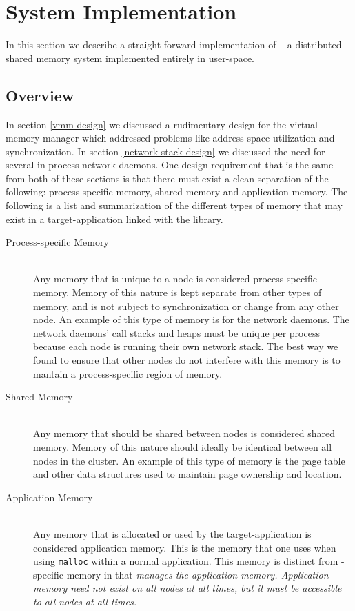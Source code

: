 \section{System Implementation}

In this section we describe a straight-forward implementation of \projname{} -- a distributed shared memory system implemented entirely in user-space.

\subsection{Overview}
In section \ref{vmm-design} we discussed a rudimentary design for the virtual memory manager which addressed problems like address space utilization and synchronization.  In section \ref{network-stack-design} we discussed the need for several in-process network daemons.  One design requirement that is the same from both of these sections is that there must exist a clean separation of the following: process-specific memory, shared memory and application memory.  The following is a list and summarization of the different types of memory that may exist in a target-application linked with the \projname{} library.

\begin{description}
\item[Process-specific Memory] \hfill \\
Any memory that is unique to a \projname{} node is considered process-specific memory.  Memory of this nature is kept separate from other types of memory, and is not subject to synchronization or change from any other node.  An example of this type of memory is for the network daemons.  The network daemons' call stacks and heaps must be unique per process because each node is running their own network stack.  The best way we found to ensure that other nodes do not interfere with this memory is to mantain a process-specific region of memory.

\item[Shared Memory] \hfill \\
Any memory that should be shared between \projname{} nodes is considered shared memory.  Memory of this nature should ideally be identical between all nodes in the cluster.  An example of this type of memory is the page table and other data structures used to maintain page ownership and location.

\item[Application Memory] \hfill \\
Any memory that is allocated or used by the target-application is considered application memory.  This is the memory that one uses when using \verb,malloc, within a normal application.  This memory is distinct from \projname{}-specific memory in that \projname{} \em manages \em the application memory.  Application memory need not exist on all nodes at all times, but it must be accessible to all nodes at all times.
\end{description}


